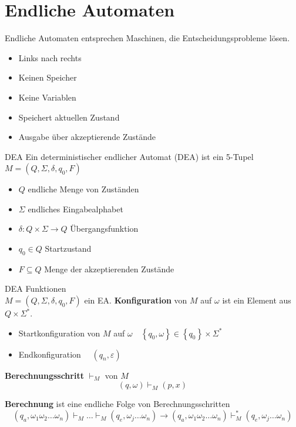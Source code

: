 \section*{Endliche Automaten}

\begin{definition}{Endliche Automaten}
    entsprechen Maschinen, die Entscheidungsprobleme lösen.

    \begin{itemize}
    \item Links nach rechts
    \item Keinen Speicher
    \item Keine Variablen
    \item Speichert aktuellen Zustand
    \item Ausgabe über akzeptierende Zustände
    \end{itemize}
\end{definition}

\begin{definition}{DEA}
    Ein deterministischer endlicher Automat (DEA) ist ein 5-Tupel $M=(Q, \Sigma, \delta, q_{0}, F)$
    \begin{itemize}
    \item $Q$ endliche Menge von Zuständen
    \item $\Sigma$ endliches Eingabealphabet
    \item $\delta: Q \times \Sigma \rightarrow Q$ Übergangsfunktion
    \item $q_{0} \in Q$ Startzustand
    \item $F \subseteq Q$ Menge der akzeptierenden Zustände
    \end{itemize}
\end{definition}

\begin{KR}{DEA Funktionen}\\
    $M=\left(Q, \Sigma, \delta, q_{0}, F\right)$ ein EA. \textbf{Konfiguration} von $M$ auf $\omega$ ist ein Element aus $Q \times \Sigma^{*}$.
    \begin{itemize}
    \item Startkonfiguration von $M$ auf $\omega \quad \left\{q_{0}, \omega\right\} \in\left\{q_{0}\right\} \times \Sigma^{*}$
    \item Endkonfiguration $\quad \left(q_{n}, \varepsilon\right)$
    \end{itemize}

    \textbf{Berechnungsschritt} $\vdash_{M}$ von $M$
    $$
    (q, \omega) \vdash_{M}(p, x)
    $$

    \textbf{Berechnung} ist eine endliche Folge von Berechnungsschritten
    $$
    \left(q_{a}, \omega_{1} \omega_{2} \ldots \omega_{n}\right) \vdash_{M} \ldots \vdash_{M}\left(q_{e}, \omega_{j} \ldots \omega_{n}\right) \rightarrow\left(q_{a}, \omega_{1} \omega_{2} \ldots \omega_{n}\right) \vdash_{M}^{*}\left(q_{e}, \omega_{j} \ldots \omega_{n}\right)
    $$
\end{KR}

